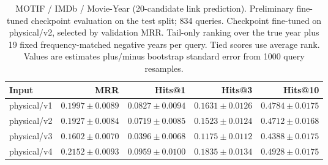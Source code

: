 \begin{table}[t]
\centering
\small
\begin{tabular}{lrrrr}
\toprule
Input & MRR & Hits@1 & Hits@3 & Hits@10 \\
\midrule
physical/v1 & $0.1997 \pm 0.0089$ & $0.0827 \pm 0.0094$ & $0.1631 \pm 0.0126$ & $0.4784 \pm 0.0175$ \\
physical/v2 & $0.1927 \pm 0.0084$ & $0.0719 \pm 0.0085$ & $0.1523 \pm 0.0124$ & $0.4712 \pm 0.0168$ \\
physical/v3 & $0.1602 \pm 0.0070$ & $0.0396 \pm 0.0068$ & $0.1175 \pm 0.0112$ & $0.4388 \pm 0.0175$ \\
physical/v4 & $0.2152 \pm 0.0093$ & $0.0959 \pm 0.0100$ & $0.1835 \pm 0.0134$ & $0.4928 \pm 0.0175$ \\
\bottomrule
\end{tabular}
\caption{MOTIF / IMDb / Movie-Year (20-candidate link prediction). Preliminary fine-tuned checkpoint evaluation on the test split; 834 queries. Checkpoint fine-tuned on physical/v2, selected by validation MRR. Tail-only ranking over the true year plus 19 fixed frequency-matched negative years per query. Tied scores use average rank. Values are estimates plus/minus bootstrap standard error from 1000 query resamples.}
\label{tab:motif-movie_year-link_prediction}
\end{table}
